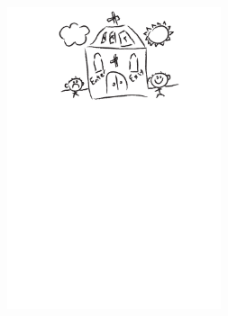 \documentclass[preprint, aps, rmp, singlecolumn, amsmath, amssymb, nofootinbib, superscriptaddress, longbibliography, floatfix, table-of-contents, eqsecnum]{revtex4-1}
\begin{document}






\begin{center}
	\includegraphics[width=0.47\textwidth]{sketch_final}
\end{center}
\end{document}
